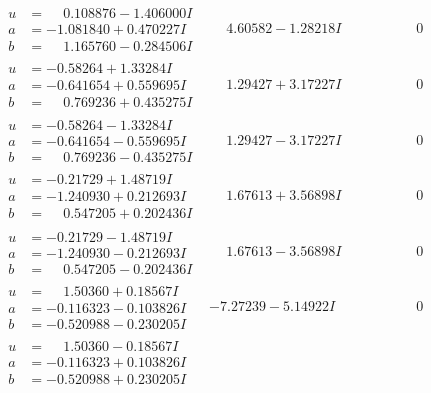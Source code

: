 \documentclass[1p]{elsarticle_modified}
\theoremstyle{definition}
\begin{document}
$$\begin{array}{c|c|c}
\begin{aligned}
u &= \phantom{-}0.108876 - 1.406000 I \\
a &= -1.081840 + 0.470227 I \\
b &= \phantom{-}1.165760 - 0.284506 I\end{aligned}
 & \phantom{-}4.60582 - 1.28218 I & \phantom{-0.000000 } 0 \\ \hline\begin{aligned}
u &= -0.58264 + 1.33284 I \\
a &= -0.641654 + 0.559695 I \\
b &= \phantom{-}0.769236 + 0.435275 I\end{aligned}
 & \phantom{-}1.29427 + 3.17227 I & \phantom{-0.000000 } 0 \\ \hline\begin{aligned}
u &= -0.58264 - 1.33284 I \\
a &= -0.641654 - 0.559695 I \\
b &= \phantom{-}0.769236 - 0.435275 I\end{aligned}
 & \phantom{-}1.29427 - 3.17227 I & \phantom{-0.000000 } 0 \\ \hline\begin{aligned}
u &= -0.21729 + 1.48719 I \\
a &= -1.240930 + 0.212693 I \\
b &= \phantom{-}0.547205 + 0.202436 I\end{aligned}
 & \phantom{-}1.67613 + 3.56898 I & \phantom{-0.000000 } 0 \\ \hline\begin{aligned}
u &= -0.21729 - 1.48719 I \\
a &= -1.240930 - 0.212693 I \\
b &= \phantom{-}0.547205 - 0.202436 I\end{aligned}
 & \phantom{-}1.67613 - 3.56898 I & \phantom{-0.000000 } 0 \\ \hline\begin{aligned}
u &= \phantom{-}1.50360 + 0.18567 I \\
a &= -0.116323 - 0.103826 I \\
b &= -0.520988 - 0.230205 I\end{aligned}
 & -7.27239 - 5.14922 I & \phantom{-0.000000 } 0 \\ \hline\begin{aligned}
u &= \phantom{-}1.50360 - 0.18567 I \\
a &= -0.116323 + 0.103826 I \\
b &= -0.520988 + 0.230205 I\end{aligned}

\end{array}$$
\end{document}
